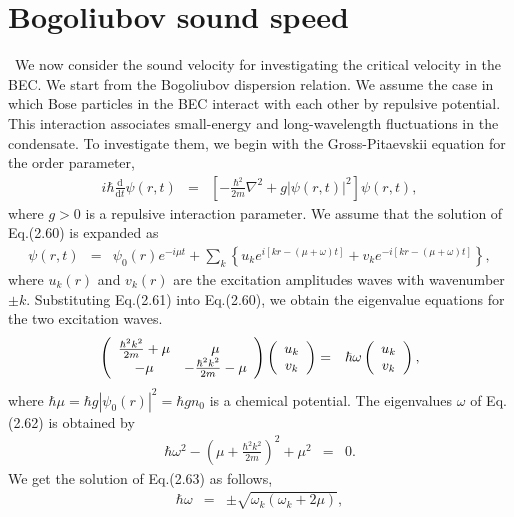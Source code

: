 \documentclass[12pt,a4paper]{report} %
\newcommand{\diff}{\mathrm{d}}				%
\begin{document}
\section{Bogoliubov sound speed}
\ We now consider the sound velocity for investigating the critical velocity in the BEC.
We start from the Bogoliubov dispersion relation.
We assume the case in which Bose particles in the BEC interact with each other by repulsive potential.
This interaction associates small-energy and long-wavelength fluctuations in the condensate.
To investigate them, we begin with the Gross-Pitaevskii equation for the order parameter,
\begin{eqnarray}
i \hbar \frac{\diff}{\diff t} \psi(r,t) & = & \left[ - \frac{\hbar^2}{2m} \nabla^2 + g | \psi(r,t) |^2 \right] \psi(r,t),
\end{eqnarray}
where $g>0$ is a repulsive interaction parameter.
We assume that the solution of Eq.(2.60) is expanded as
\begin{eqnarray}
\psi(r,t) & = & \psi_0(r)e^{-i \mu t} + 
\sum_k \left\{
u_k e^{i[kr - (\mu + \omega)t]} + v_k e^{-i[kr - (\mu + \omega)t]}
\right\},
\end{eqnarray}
where $u_k(r)$ and $v_k(r)$
are the excitation amplitudes %
waves with wavenumber $\pm k$. Substituting Eq.(2.61) into Eq.(2.60), 
we obtain the eigenvalue equations for the two excitation waves.
\begin{eqnarray}
\left(
\begin{array}{c c}
\frac{\hbar^2 k^2}{2m} + \mu & \mu
\\
-\mu & -\frac{\hbar^2 k^2}{2m} - \mu
\end{array}
\right)
\left(
\begin{array}{c}
u_k
\\
v_k
\end{array}
\right)
& = & 
\hbar \omega
\left(
\begin{array}{c}
u_k
\\
v_k
\end{array}
\right),
\end{eqnarray}
where $\hbar \mu = \hbar g|\psi_0(r)|^2 = \hbar gn_0$ is a chemical potential.
The eigenvalues $\omega$ of Eq.(2.62) is obtained by
\begin{eqnarray}
\hbar \omega^2 - \left(
\mu + \frac{\hbar^2 k^2}{2m}
\right)^2
+ \mu^2 & = & 0.
\end{eqnarray}
We get the solution of Eq.(2.63) as follows,
\begin{eqnarray}
\hbar \omega & = & \pm \sqrt{\omega_k (\omega_k + 2\mu)},
\end{eqnarray}
\end{document}

